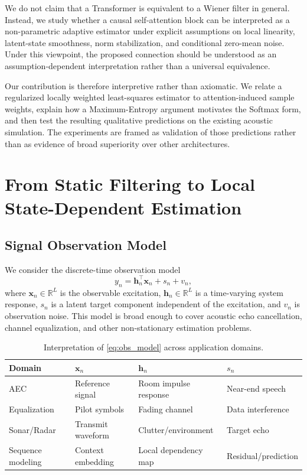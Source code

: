 \documentclass[conference]{IEEEtran}
\begin{document}
We do not claim that a Transformer is equivalent to a Wiener filter in general. Instead, we study whether a causal self-attention block can be interpreted as a non-parametric adaptive estimator under explicit assumptions on local linearity, latent-state smoothness, norm stabilization, and conditional zero-mean noise. Under this viewpoint, the proposed connection should be understood as an assumption-dependent interpretation rather than a universal equivalence.

Our contribution is therefore interpretive rather than axiomatic. We relate a regularized locally weighted least-squares estimator to attention-induced sample weights, explain how a Maximum-Entropy argument motivates the Softmax form, and then test the resulting qualitative predictions on the existing acoustic simulation. The experiments are framed as validation of those predictions rather than as evidence of broad superiority over other architectures.

\section{From Static Filtering to Local State-Dependent Estimation}
\label{sec:formulation}

\subsection{Signal Observation Model}
We consider the discrete-time observation model
\begin{equation}
y_n = \mathbf{h}_n^\top \mathbf{x}_n + s_n + v_n,
\label{eq:obs_model}
\end{equation}
where $\mathbf{x}_n \in \mathbb{R}^L$ is the observable excitation, $\mathbf{h}_n \in \mathbb{R}^L$ is a time-varying system response, $s_n$ is a latent target component independent of the excitation, and $v_n$ is observation noise. This model is broad enough to cover acoustic echo cancellation, channel equalization, and other non-stationary estimation problems.

\begin{table}[htbp]
\centering
\caption{Interpretation of \eqref{eq:obs_model} across application domains.}
\label{tab:mapping}
\scriptsize
\setlength{\tabcolsep}{2pt}
\renewcommand{\arraystretch}{1.2}
\begin{tabular}{@{}p{} p{} p{} p{}@{}}
\toprule
\textbf{Domain} & $\mathbf{x}_n$ & $\mathbf{h}_n$ & $s_n$ \\ \midrule
AEC & Reference signal & Room impulse response & Near-end speech \\
Equalization & Pilot symbols & Fading channel & Data interference \\
Sonar/Radar & Transmit waveform & Clutter/environment & Target echo \\
Sequence modeling & Context embedding & Local dependency map & Residual/prediction \\ \bottomrule
\end{tabular}
\end{table}
\end{document}

